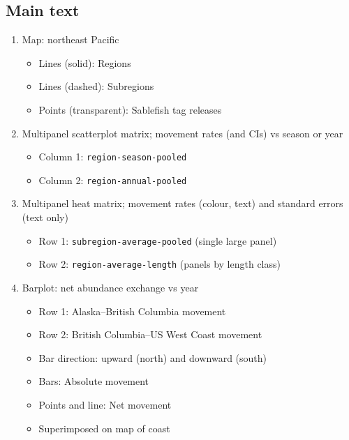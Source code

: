 \documentclass{article}
\begin{document}
\subsection{Main text}
\begin{enumerate}
    \item Map: northeast Pacific
    \begin{itemize}
        \item Lines (solid): Regions
        \item Lines (dashed): Subregions
        \item Points (transparent): Sablefish tag releases
    \end{itemize}
    \item Multipanel scatterplot matrix; movement rates (and CIs) vs season or year
    \begin{itemize}
        \item Column 1: \texttt{region-season-pooled}
        \item Column 2: \texttt{region-annual-pooled}
    \end{itemize}
    \item Multipanel heat matrix; movement rates (colour, text) and standard errors (text only)
    \begin{itemize}
        \item Row 1: \texttt{subregion-average-pooled} (single large panel)
        \item Row 2: \texttt{region-average-length} (panels by length class)
    \end{itemize}
    \item Barplot: net abundance exchange vs year
    \begin{itemize}
        \item Row 1: Alaska--British Columbia movement
        \item Row 2: British Columbia--US West Coast movement
        \item Bar direction: upward (north) and downward (south)
        \item Bars: Absolute movement
        \item Points and line: Net movement
        \item Superimposed on map of coast
    \end{itemize}
\end{enumerate}
\end{document}
